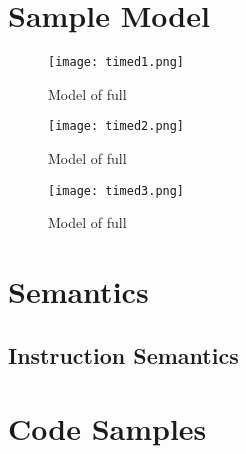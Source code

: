 \chapter{\jcl Sample Model}
\label{app:sample1}


\begin{figure}[H]
  \centering
  \texttt{[image: timed1.png]}
  \caption{Model of full \jcl}
\end{figure}
\begin{figure}
  \centering
  \texttt{[image: timed2.png]}
  \caption{Model of full \jcl}
\end{figure}
\begin{figure}
  \centering
  \texttt{[image: timed3.png]}
  \caption{Model of full \jcl}
\end{figure}

\chapter{Semantics}\label{chap:semantics}

\section{Instruction Semantics}



\chapter{Code Samples}
